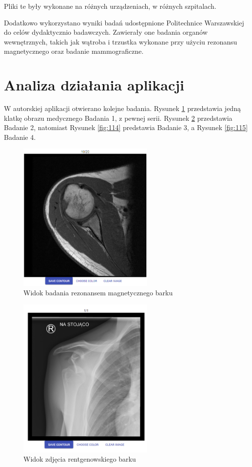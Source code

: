 \documentclass[a4paper,11pt,twoside,openright]{report}
\theoremstyle{definition}
\begin{document}
Pliki te były wykonane na różnych urządzeniach, w różnych szpitalach.

Dodatkowo wykorzystano wyniki badań udostępnione Politechnice Warszawskiej do
celów dydaktycznio badawczych. Zawierały one badania organów wewnętrznych, takich
jak wątroba i trzustka wykonane przy użyciu rezonansu magnetycznego oraz badanie mammograficzne.

\section {Analiza działania aplikacji}

W autorskiej aplikacji otwierano kolejne badania. Rysunek \ref{fig:112} przedstawia
jedną klatkę obrazu medycznego Badania 1, z pewnej serii. Rysunek \ref{fig:113}
przedstawia Badanie 2, natomiast Rysunek \ref{fig:114} predstawia Badanie 3, a
Rysunek \ref{fig:115} Badanie 4.

\begin{figure}[p]
	\center
	\includegraphics[width=0.6\textwidth]{112}
	\caption{Widok badania rezonansem magnetycznego barku}
    	\label{fig:112}
\end{figure}

\begin{figure}[p]
	\center
	\includegraphics[width=0.6\textwidth]{113}
	\caption{Widok zdjęcia rentgenowskiego barku}
    	\label{fig:113}
\end{figure}
\end{document}
